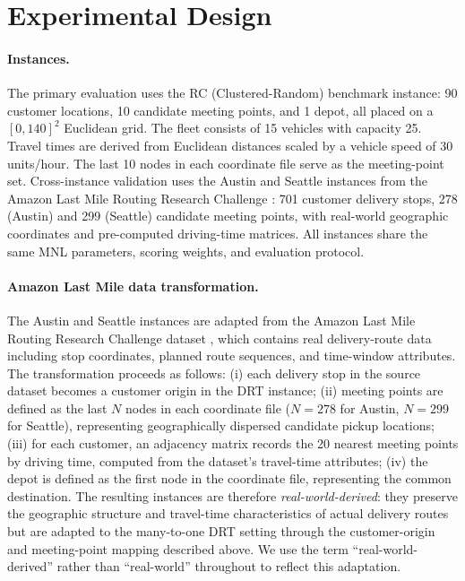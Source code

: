 \section{Experimental Design}
\label{sec:experiments}

\paragraph{Instances.} The primary evaluation uses the RC (Clustered-Random) benchmark instance: 90 customer locations, 10 candidate meeting points, and 1 depot, all placed on a $[0, 140]^2$ Euclidean grid. The fleet consists of 15 vehicles with capacity 25. Travel times are derived from Euclidean distances scaled by a vehicle speed of 30 units/hour. The last 10 nodes in each coordinate file serve as the meeting-point set. Cross-instance validation uses the Austin and Seattle instances from the Amazon Last Mile Routing Research Challenge \citep{merchan2022amazon}: 701 customer delivery stops, 278 (Austin) and 299 (Seattle) candidate meeting points, with real-world geographic coordinates and pre-computed driving-time matrices. All instances share the same MNL parameters, scoring weights, and evaluation protocol.

\paragraph{Amazon Last Mile data transformation.} The Austin and Seattle instances are adapted from the Amazon Last Mile Routing Research Challenge dataset \citep{merchan2022amazon}, which contains real delivery-route data including stop coordinates, planned route sequences, and time-window attributes. The transformation proceeds as follows: (i) each delivery stop in the source dataset becomes a customer origin in the DRT instance; (ii) meeting points are defined as the last $N$ nodes in each coordinate file ($N = 278$ for Austin, $N = 299$ for Seattle), representing geographically dispersed candidate pickup locations; (iii) for each customer, an adjacency matrix records the 20 nearest meeting points by driving time, computed from the dataset's travel-time attributes; (iv) the depot is defined as the first node in the coordinate file, representing the common destination. The resulting instances are therefore \emph{real-world-derived}: they preserve the geographic structure and travel-time characteristics of actual delivery routes but are adapted to the many-to-one DRT setting through the customer-origin and meeting-point mapping described above. We use the term ``real-world-derived'' rather than ``real-world'' throughout to reflect this adaptation.

